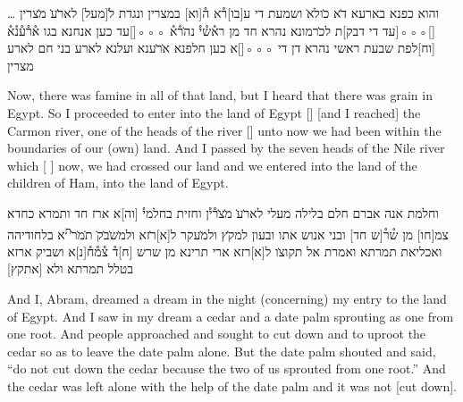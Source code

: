
\begin{aramaictext}
    \dots
    \vacat
    והוא כפנא בארעא ד̇א כ̇ולא̇ ושמעת די ע[בו]ר֯א 
    ה֯[וא] במצרין ונגדת
    ל̇[מעל] לאר̇̇ע̇ מ̇צרין [\hspace*{1.5em}]◦◦◦[\hspace*{1.5em}עד די דבק]ת לכ̇רמונא נהרא חד מן 
    רא֯ש֯י֯ נה̇ר֯א֯ ◦◦◦[\hspace*{1.5em}]עד כען אנחנא בגו א֯ר֯ע֯נ֯א֯ [וח]לפת שבעת ראשי נהרא דן 
    די
    ◦◦◦[\hspace*{1.5em}]א כען חלפנא א̇ר̇ענא ועלנא לארע בני חם לארע מצרין
\end{aramaictext}

\begin{translation}
    Now, there was famine in all of that land, but I heard that there was grain in Egypt. So I proceeded 
    to enter into the land of Egypt [\hspace*{1em}] [and I reached] the Carmon river, one of 
    the heads of the river [\hspace*{1em}] unto now we had been within the boundaries of our (own) land. And I passed by the seven heads of the Nile river which [
    ] now, we had crossed our land and we entered into the land of the children of Ham, into the land of Egypt.
\end{translation}

\begin{aramaictext}
    \vacat
    וחלמת אנה אברם חלם בלילה מעלי לאר̇ע̇ מ̇צ̇ר֯י֯ן וחזית בחלמי֯ [וה]א 
    ארז חד ותמרא
    כחדא צמ[חו] מן ש֯ר֯[ש חד] ובני אנוש אתו ובעון למק̇ץ ולמ̇עקר ל[א]ר̇זא 
    ולמ̇ש̇ב̇ק̇ ת̇מ̇ר̇\textsuperscript{ת}א בלחודיהה
    ואכליאת תמרתא ואמרת אל תקוצ̇ו ל[א]רזא ארי תרינא מן שרש [ח]ד֯ 
    צ֯מ֯ח֯[נ]א ושביק ארזא בטלל תמרתא
    ולא [אתקץ] \vacat
\end{aramaictext}

\begin{translation}
    And I, Abram, dreamed a dream in the night (concerning) my entry to the land of Egypt.  And I saw in my dream a cedar and a date palm
    sprouting as one from one root. And people approached and sought to cut down and to uproot the cedar so as to leave the date palm alone.
    But the date palm shouted and said, ``do not cut down the cedar because the two of us sprouted from one root.'' And the cedar was left alone with the help of the date palm
    and it was not [cut down].
\end{translation}

